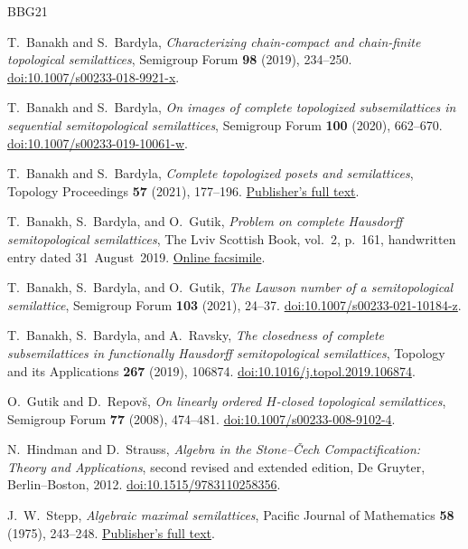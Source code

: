 \documentclass[11pt,a4paper]{article}
\theoremstyle{definition}
\theoremstyle{remark}
\numberwithin{equation}{section}
\begin{document}
\begin{thebibliography}{BBG21}
\small\raggedright

T.~Banakh and S.~Bardyla,
\emph{Characterizing chain-compact and chain-finite topological semilattices},
Semigroup Forum \textbf{98} (2019), 234--250.
\href{https://doi.org/10.1007/s00233-018-9921-x}{doi:10.1007/s00233-018-9921-x}.

T.~Banakh and S.~Bardyla,
\emph{On images of complete topologized subsemilattices in sequential
semitopological semilattices},
Semigroup Forum \textbf{100} (2020), 662--670.
\href{https://doi.org/10.1007/s00233-019-10061-w}{doi:10.1007/s00233-019-10061-w}.

T.~Banakh and S.~Bardyla,
\emph{Complete topologized posets and semilattices},
Topology Proceedings \textbf{57} (2021), 177--196.
\href{https://topology.nipissingu.ca/tp/reprints/v57/tp57012.pdf}{Publisher's full text}.

T.~Banakh, S.~Bardyla, and O.~Gutik,
\emph{Problem on complete Hausdorff semitopological semilattices},
The Lviv Scottish Book, vol.~2, p.~161,
handwritten entry dated 31~August~2019.
\href{https://www.math.lviv.ua/szkocka/viewpage.php?vol=2&page=161}{Online facsimile}.

T.~Banakh, S.~Bardyla, and O.~Gutik,
\emph{The Lawson number of a semitopological semilattice},
Semigroup Forum \textbf{103} (2021), 24--37.
\href{https://doi.org/10.1007/s00233-021-10184-z}{doi:10.1007/s00233-021-10184-z}.

T.~Banakh, S.~Bardyla, and A.~Ravsky,
\emph{The closedness of complete subsemilattices in functionally Hausdorff
semitopological semilattices},
Topology and its Applications \textbf{267} (2019), 106874.
\href{https://doi.org/10.1016/j.topol.2019.106874}{doi:10.1016/j.topol.2019.106874}.

O.~Gutik and D.~Repov\v{s},
\emph{On linearly ordered \(H\)-closed topological semilattices},
Semigroup Forum \textbf{77} (2008), 474--481.
\href{https://doi.org/10.1007/s00233-008-9102-4}{doi:10.1007/s00233-008-9102-4}.

N.~Hindman and D.~Strauss,
\emph{Algebra in the Stone--\v{C}ech Compactification:
Theory and Applications},
second revised and extended edition, De Gruyter, Berlin--Boston, 2012.
\href{https://doi.org/10.1515/9783110258356}{doi:10.1515/9783110258356}.

J.~W.~Stepp,
\emph{Algebraic maximal semilattices},
Pacific Journal of Mathematics \textbf{58} (1975), 243--248.
\href{https://msp.org/pjm/1975/58-1/pjm-v58-n1-p20-s.pdf}{Publisher's full text}.

\end{thebibliography}
\end{document}
